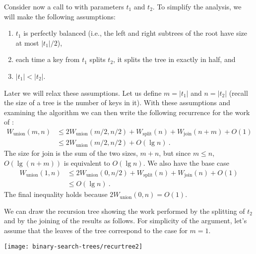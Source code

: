 \begin{chapter}
Consider now a call to  with parameters
$t_1$ and $t_2$.  To simplify the analysis, we will make the following
assumptions:
\begin{enumerate}
\item $t_1$ is perfectly balanced (i.e., the left and right subtrees of
  the root have size at most $|t_1|/2$), 
\item each time a key from $t_1$ splits $t_2$, it splits the tree in
  exactly in half, and
\item $|t_1| < |t_2|$.
\end{enumerate}
Later we will relax these assumptions.  Let us define $m = |t_1|$ and
$n = |t_2|$ (recall the size of a tree is the number of keys in it).
With these assumptions and examining the algorithm we can then write
the following recurrence for the work of :
\begin{align*}
  W_{\mbox{union}}(m, n) &\leq 2W_{\mbox{union}}(m/2,n/2) + W_{\mbox{split}}(n)
+ W_{\mbox{join}}(n+m) + O(1)\\
   & \leq  2W_{\mbox{union}}(m/2, n/2) + O(\lg n)~.
\end{align*}  
The size for join is the sum of the two sizes, $m+n$, but since 
$m \leq n$, $O(\lg (n + m))$ is equivalent to $O(\lg n)$.
We also have the base case
\begin{align*}
  W_{\mbox{union}}(1, n) & \leq 2W_{\mbox{union}}(0,n/2) + W_{\mbox{split}}(n)
+ W_{\mbox{join}}(n) + O(1)\\
         & \leq O(\lg n)~.
\end{align*}
The final inequality holds because $2W_{\mbox{union}}(0,n) = O(1)$.

We can draw the recursion tree showing the work performed by the
splitting of $t_2$ and by the joining of the results as follows.  For
simplicity of the argument, let's assume that the leaves of the tree
correspond to the case for $m = 1$.


\begin{center}
  \texttt{[image: binary-search-trees/recurtree2]}
\end{center}
%


\end{chapter}
